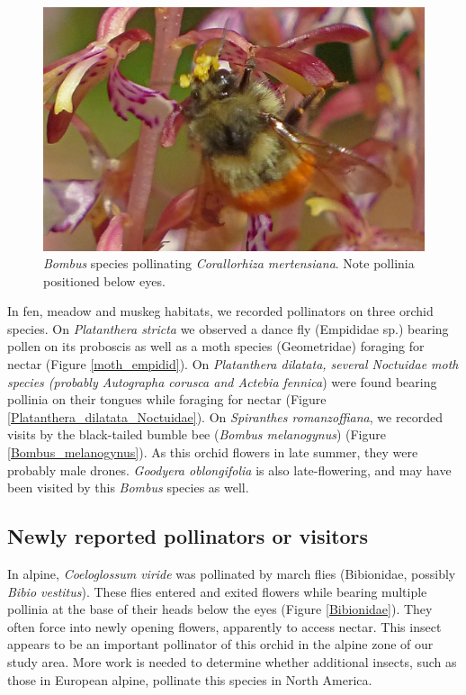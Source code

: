\begin{multicols}{2}
\begin{figure}[H]
\begin{center}
\vspace{2mm}
\includegraphics[width=\textwidth]{img/Corallorhiza_mertensiana_Bombus.jpg}
\caption{\emph{Bombus} species pollinating \emph{Corallorhiza mertensiana}. Note pollinia positioned below eyes.}
\label{Corallorhiza_mertensiana_Bombus}
\end{center}
\end{figure}

In fen, meadow and muskeg habitats, we recorded pollinators on
three orchid species. On \emph{Platanthera stricta} we observed a
dance fly (Empididae sp.) bearing pollen on its proboscis as well
as a moth species (Geometridae) foraging for nectar (Figure \ref{moth_empidid}). On
\emph{Platanthera dilatata, several Noctuidae moth species
(probably \emph{Autographa corusca} and \emph{Actebia fennica}}) were
found bearing pollinia on their tongues while foraging for nectar
(Figure \ref{Platanthera_dilatata_Noctuidae}). On \emph{Spiranthes romanzoffiana}, we recorded visits by
the black-tailed bumble bee (\emph{Bombus melanogynus}) (Figure \ref{Bombus_melanogynus}). As
this orchid flowers in late summer, they were probably male drones.
\emph{Goodyera oblongifolia} is also late-flowering, and may have been
visited by this \emph{Bombus} species as well.





\subsection{Newly reported pollinators or visitors}

In alpine, \emph{Coeloglossum viride} was pollinated by march flies
(Bibionidae, possibly \emph{Bibio vestitus}). These flies entered and
exited flowers while bearing multiple pollinia at the base of their
heads below the eyes (Figure \ref{Bibionidae}). They often force into newly opening
flowers, apparently to access nectar. This insect appears to be an
important pollinator of this orchid in the alpine zone of our study
area. More work is needed to determine whether additional insects, such
as those in European alpine, pollinate this species in North America.


\end{multicols}
